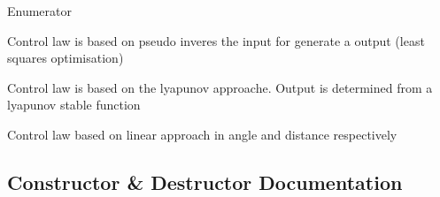 \begin{Desc}
\item[Enumerator]\par
\begin{description}
\item[{\em 
pseudo\+\_\+inverse\hypertarget{classController_aa6d956c4c220461a4152415ffa78690aad2e9073ef821965020410686a3c89483}{}\label{classController_aa6d956c4c220461a4152415ffa78690aad2e9073ef821965020410686a3c89483}
}]Control law is based on pseudo inveres the input for generate a output (least squares optimisation) \item[{\em 
lypanov\hypertarget{classController_aa6d956c4c220461a4152415ffa78690aaed0e850e561d54619d85f32c37f5bfab}{}\label{classController_aa6d956c4c220461a4152415ffa78690aaed0e850e561d54619d85f32c37f5bfab}
}]Control law is based on the lyapunov approache. Output is determined from a lyapunov stable function \item[{\em 
angle\+\_\+distance\hypertarget{classController_aa6d956c4c220461a4152415ffa78690aa7ab0ee34114a951d4491d6eb73500cdc}{}\label{classController_aa6d956c4c220461a4152415ffa78690aa7ab0ee34114a951d4491d6eb73500cdc}
}]Control law based on linear approach in angle and distance respectively \end{description}
\end{Desc}


\subsection{Constructor \& Destructor Documentation}
